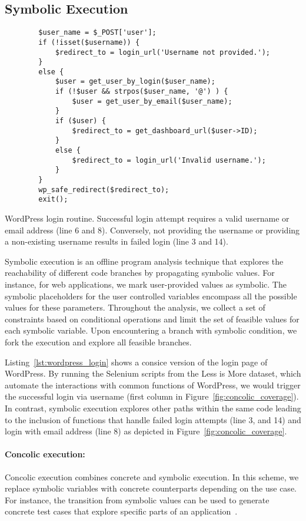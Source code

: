 \subsection{Symbolic Execution}
\label{sec:background_symbolic}
\begin{listing}[t]
	\begin{verbatim}
		$user_name = $_POST['user'];
		if (!isset($username)) {
			$redirect_to = login_url('Username not provided.');
		}
		else {
			$user = get_user_by_login($user_name);
			if (!$user && strpos($user_name, '@') ) {
				$user = get_user_by_email($user_name);
			}
			if ($user) {
				$redirect_to = get_dashboard_url($user->ID);
			}
			else {
				$redirect_to = login_url('Invalid username.');
			}
		}
		wp_safe_redirect($redirect_to);
		exit();
	\end{verbatim}
	\caption{WordPress login routine. Successful login attempt requires a valid username or email address (line 6 and 8). Conversely, not providing the username or providing a non-existing username results in failed login (line 3 and 14).}
	\label{lst:wordpress_login}
\end{listing}

Symbolic execution is an offline program analysis technique that explores the reachability of different code branches by propagating symbolic values. 
For instance, for web applications, we mark user-provided values as symbolic. 
The symbolic placeholders for the user controlled variables encompass all the possible values for these parameters. 
Throughout the analysis, we collect a set of constraints based on conditional operations and limit the set of feasible values for each symbolic variable. 
Upon encountering a branch with symbolic condition, we fork the execution and explore all feasible branches. 

Listing~\ref{lst:wordpress_login} shows a consice version of the login page of WordPress. 
By running the Selenium scripts from the Less is More dataset, which automate the interactions with common functions of WordPress, we would trigger the successful login via username (first column in Figure~\ref{fig:concolic_coverage}). 
In contrast, symbolic execution explores other paths within the same code leading to the inclusion of functions that handle failed login attempts (line 3, and 14) and login with email address (line 8) as depicted in Figure~\ref{fig:concolic_coverage}. 

\paragraph{Concolic execution:} 
Concolic execution combines concrete and symbolic execution. 
In this scheme, we replace symbolic variables with concrete counterparts depending on the use case. 
For instance, the transition from symbolic values can be used to generate concrete test cases that explore specific parts of an application~\cite{10.1145/1081706.1081750}. 

